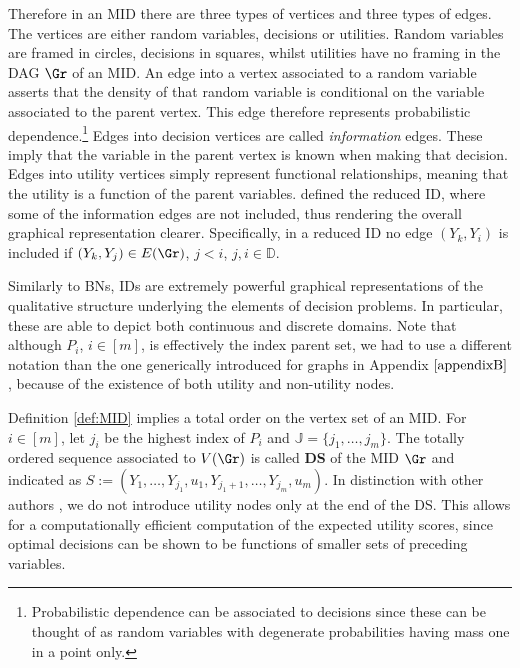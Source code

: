 Therefore in an \gls{MID} there are three types of vertices and three types of edges. The vertices are either random variables, decisions or utilities. Random variables are framed in circles, decisions in squares, whilst utilities have no framing in the \gls{DAG} $\Gr$ of an \gls{MID}. An edge into a vertex associated to a random variable asserts that the density of that random variable is conditional on the variable associated to the parent vertex. This edge therefore represents probabilistic dependence.\footnote{Probabilistic dependence can be associated to decisions since these can be thought of as random variables with degenerate probabilities having mass one in a point only.} Edges into decision vertices are called \textit{information} edges. These imply that the variable in the parent vertex is known when making that decision. Edges into utility vertices simply represent functional relationships, meaning that the utility is a function of the parent variables. \citet{Smith2010} defined the reduced \gls{ID}, where some of the information edges are not included, thus rendering the overall graphical representation clearer. Specifically, in a reduced \gls{ID} no edge $(Y_k,Y_i)$ is included if $(Y_k,Y_j)\in E(\Gr)$, $j<i$, $j,i\in\mathbb{D}$. 

Similarly to \glspl{BN}, \glspl{ID} are extremely powerful graphical representations of the qualitative structure underlying the elements of decision problems. In particular, these are able to depict both continuous and discrete domains. Note that although $P_i$, $i\in [m]$, is effectively the index parent set, we had to use a different notation than the one generically introduced for graphs in Appendix $\ref{appendixB}$, because of the existence of both utility and non-utility nodes.

Definition \ref{def:MID} implies a total order on the vertex set of an \gls{MID}. For $i\in[m]$, let $j_i$ be the highest index of $P_i$ and $\mathbb{J}=\{j_1,\dots, j_m\}$. The totally ordered sequence associated to $V(\Gr)$ is called \textbf{\gls{DS}} of the \gls{MID} $\Gr$ and  indicated as   $S:=(Y_1,\dots,Y_{j_1},u_1,Y_{j_1+1},\dots,Y_{j_m},u_m)$.  In distinction with other authors \citep[e.g.][]{Jensen2009,Cowell1999a}, we do not introduce utility nodes only at the end of the \gls{DS}. This allows for a computationally efficient computation of the expected utility scores, since optimal decisions can be shown to be functions of smaller sets of preceding variables.

